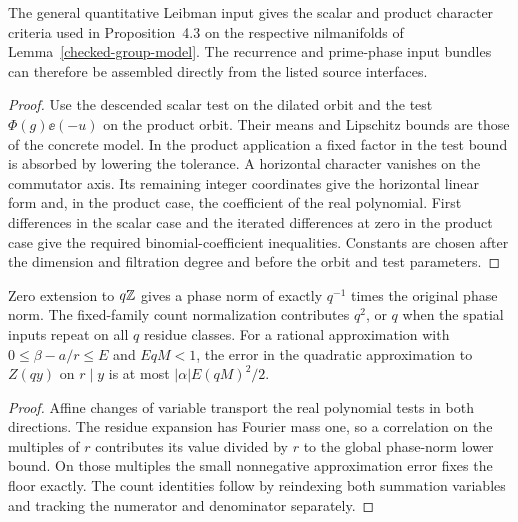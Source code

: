 \begin{lemma}\label{checked-green-tao-adapter}
\leanok
The general quantitative Leibman input gives the scalar and product
character criteria used in Proposition~4.3 on the respective
nilmanifolds of Lemma~\ref{checked-group-model}.
The recurrence and prime-phase input bundles can therefore be
assembled directly from the listed source interfaces.
\end{lemma}
\begin{proof}
\leanok
Use the descended scalar test on the dilated orbit and the test
$\Phi(g)\ee(-u)$ on the product orbit. Their means and Lipschitz bounds
are those of the concrete model. In the product application a fixed
factor in the test bound is absorbed by lowering the tolerance.
A horizontal character vanishes on the commutator axis. Its
remaining integer coordinates give the horizontal linear form
and, in the product case, the coefficient of the real polynomial.
First differences in the scalar case and the iterated differences
at zero in the product case give the required binomial-coefficient
inequalities. Constants are chosen after the dimension and
filtration degree and before the orbit and test parameters.
\end{proof}

\begin{lemma}\label{checked-separating-finite}
\leanok
Zero extension to $q\mathbb Z$ gives a phase norm of exactly $q^{-1}$
times the original phase norm. The fixed-family count normalization
contributes $q^2$, or $q$ when the spatial inputs repeat on all
$q$ residue classes. For a rational approximation with
$0\le\beta-a/r\le E$ and $E qM<1$, the error in the quadratic
approximation to $Z(qy)$ on $r\mid y$ is at most
$|\alpha|E(qM)^2/2$.
\end{lemma}
\begin{proof}
\leanok
Affine changes of variable transport the real polynomial tests in
both directions. The residue expansion has Fourier mass one, so a
correlation on the multiples of $r$ contributes its value divided
by $r$ to the global phase-norm lower bound. On those multiples
the small nonnegative approximation error fixes the floor exactly.
The count identities follow by reindexing both summation variables
and tracking the numerator and denominator separately.
\end{proof}

